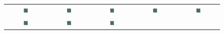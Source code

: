\documentclass[12pt]{article}
\begin{document}
\begin{figure}[!h]
	\centering
	\begin{tabular}{ccccc}
		\includegraphics[width=0.18\textwidth]{figures/empty-room_FixedAgent/0.png} &
		\includegraphics[width=0.18\textwidth]{figures/empty-room_FixedAgent/1.png} &
		\includegraphics[width=0.18\textwidth]{figures/empty-room_FixedAgent/2.png} &
		\includegraphics[width=0.18\textwidth]{figures/empty-room_FixedAgent/3.png} &
		\includegraphics[width=0.18\textwidth]{figures/empty-room_FixedAgent/4.png}   \\
		\includegraphics[width=0.18\textwidth]{figures/empty-room_FixedAgent/5.png} &
		\includegraphics[width=0.18\textwidth]{figures/empty-room_FixedAgent/6.png} &
		\includegraphics[width=0.18\textwidth]{figures/empty-room_FixedAgent/7.png} &

\end{tabular}
\end{figure}
\end{document}
